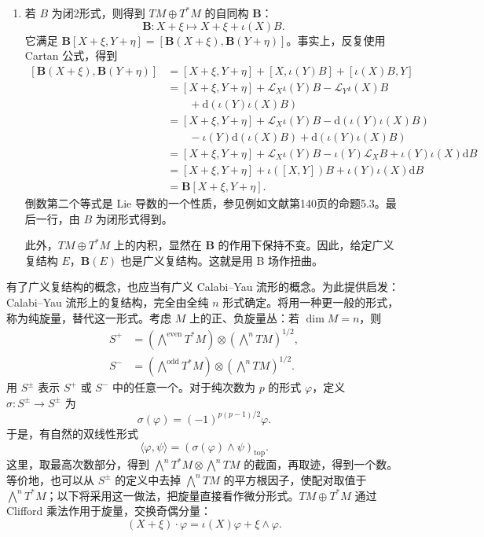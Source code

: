 \begin{example}
\begin{enumerate}[label=(\arabic*),start=3]
\item 若 $B$ 为闭2形式，则得到 $TM\oplus T^*M$ 的自同构 $\mathbf B$：
\[
\mathbf B\colon X+\xi\longmapsto X+\xi+\iota(X)B.
\]
它满足 $\mathbf B[X+\xi,Y+\eta]=[\mathbf B(X+\xi),\mathbf B(Y+\eta)]$。事实上，反复使用 Cartan 公式，得到
\[
\begin{aligned}
[\mathbf B(X+\xi),\mathbf B(Y+\eta)]
&=[X+\xi,Y+\eta]+[X,\iota(Y)B]+[\iota(X)B,Y]\\
&=[X+\xi,Y+\eta]+\mathcal L_X\iota(Y)B-\mathcal L_Y\iota(X)B\\
&\qquad+\mathrm d(\iota(Y)\iota(X)B)\\
&=[X+\xi,Y+\eta]+\mathcal L_X\iota(Y)B-\mathrm d(\iota(Y)\iota(X)B)\\
&\qquad-\iota(Y)\mathrm d(\iota(X)B)+\mathrm d(\iota(Y)\iota(X)B)\\
&=[X+\xi,Y+\eta]+\mathcal L_X\iota(Y)B-\iota(Y)\mathcal L_XB
+\iota(Y)\iota(X)\mathrm dB\\
&=[X+\xi,Y+\eta]+\iota([X,Y])B+\iota(Y)\iota(X)\mathrm dB\\
&=\mathbf B[X+\xi,Y+\eta].
\end{aligned}
\]
倒数第二个等式是 Lie 导数的一个性质，参见例如文献第140页的命题5.3。最后一行，由 $B$ 为闭形式得到。

此外，$TM\oplus T^*M$ 上的内积，显然在 $\mathbf B$ 的作用下保持不变。因此，给定广义复结构 $E$，$\mathbf B(E)$ 也是广义复结构。这就是用 B 场作扭曲。
\end{enumerate}
\end{example}

有了广义复结构的概念，也应当有广义 Calabi--Yau 流形的概念。为此提供启发：Calabi--Yau 流形上的复结构，完全由全纯 $n$ 形式确定。将用一种更一般的形式，称为纯旋量，替代这一形式。考虑 $M$ 上的正、负旋量丛：若 $\dim M=n$，则
\[
\begin{aligned}
S^+&=\left(\bigwedge\nolimits^{\mathrm{even}}T^*M\right)
\otimes\left(\bigwedge^nTM\right)^{1/2},\\
S^-&=\left(\bigwedge\nolimits^{\mathrm{odd}}T^*M\right)
\otimes\left(\bigwedge^nTM\right)^{1/2}.
\end{aligned}
\]
用 $S^\pm$ 表示 $S^+$ 或 $S^-$ 中的任意一个。对于纯次数为 $p$ 的形式 $\varphi$，定义 $\sigma\colon S^\pm\to S^\pm$ 为
\[
\sigma(\varphi)=(-1)^{p(p-1)/2}\varphi.
\]
于是，有自然的双线性形式
\[
\langle\varphi,\psi\rangle=(\sigma(\varphi)\wedge\psi)_{\mathrm{top}}.
\]
这里，取最高次数部分，得到 $\bigwedge^nT^*M\otimes\bigwedge^nTM$ 的截面，再取迹，得到一个数。等价地，也可以从 $S^\pm$ 的定义中去掉 $\bigwedge^nTM$ 的平方根因子，使配对取值于 $\bigwedge^nT^*M$；以下将采用这一做法，把旋量直接看作微分形式。$TM\oplus T^*M$ 通过 Clifford 乘法作用于旋量，交换奇偶分量：
\[
(X+\xi)\cdot\varphi=\iota(X)\varphi+\xi\wedge\varphi.
\]


